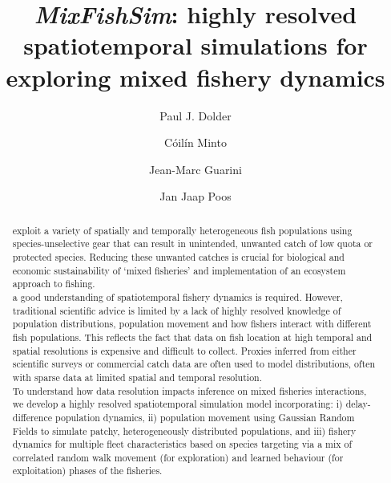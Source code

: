 \documentclass[review]{elsarticle}
\begin{document}
\begin{frontmatter}
\title{\emph{MixFishSim}: highly resolved spatiotemporal simulations for
	exploring mixed fishery dynamics}

\author[1,2]{Paul J. Dolder}

\author[1]{Cóilín Minto}
\author[3]{Jean-Marc Guarini}
\author[4]{Jan Jaap Poos}

\address[1]{Galway-Mayo Institute of Technology (GMIT), Dublin Road, Galway,
	Ireland} 
\address[2]{Centre for Environment, Fisheries and Aquaculture Science (Cefas),
	Pakefield Road, Lowestoft, UK}
\address[3]{, 4 Place Jussieu,
	75005 Paris, France}
\address[4]{Wageningen Marine Research, Haringkade 1 1976 CP IJmuiden,
	Netherlands}

\begin{abstract}

 exploit a variety 
of spatially and temporally heterogeneous fish populations using
species-unselective gear that can result in unintended, unwanted catch of low
quota or protected species. Reducing these unwanted catches is crucial for
biological and economic sustainability of `mixed fisheries' and implementation
of an ecosystem approach to fishing. \\

 a good understanding of
spatiotemporal fishery dynamics is required. However, traditional scientific
advice is limited by a lack of highly resolved knowledge of population
distributions, population movement and how fishers interact with different fish
populations. This reflects the fact that data on fish location at high temporal
and spatial resolutions is expensive and difficult to collect. Proxies inferred
from either scientific surveys or commercial catch data are often used to model
distributions, often with sparse data at limited spatial and temporal
resolution. \\ 

To understand how data resolution impacts inference on mixed fisheries
interactions, we develop a highly resolved spatiotemporal simulation model
incorporating: i) delay-difference population dynamics, ii) population movement
using Gaussian Random Fields to simulate patchy, heterogeneously distributed
populations, and iii) fishery dynamics for multiple fleet characteristics based
on species targeting via a mix of correlated random walk movement (for
exploration) and learned behaviour (for exploitation) phases of the fisheries.
\\ 


\end{abstract}
\end{frontmatter}
\end{document}
